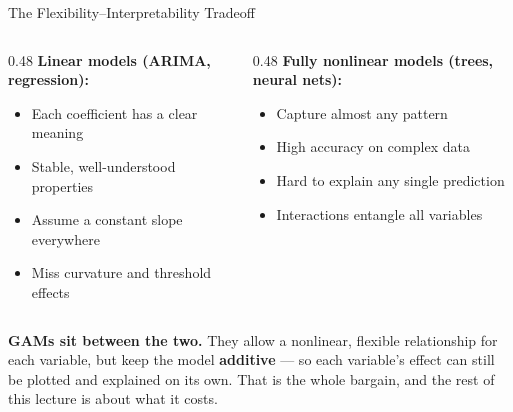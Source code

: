 \documentclass[aspectratio=169, 11pt]{beamer}
\begin{document}
\begin{frame}{The Flexibility--Interpretability Tradeoff}
  \begin{columns}[T]
    \begin{column}{0.48\textwidth}
      \textbf{Linear models (ARIMA, regression):}
      {
      \begin{itemize}\small\itemsep0pt
        \item Each coefficient has a clear meaning
        \item Stable, well-understood properties
      \end{itemize}}
      {
      \begin{itemize}\small\itemsep0pt
        \item Assume a constant slope everywhere
        \item Miss curvature and threshold effects
      \end{itemize}}
    \end{column}
    \begin{column}{0.48\textwidth}
      \textbf{Fully nonlinear models (trees, neural nets):}
      {
      \begin{itemize}\small\itemsep0pt
        \item Capture almost any pattern
        \item High accuracy on complex data
      \end{itemize}}
      {
      \begin{itemize}\small\itemsep0pt
        \item Hard to explain any single prediction
        \item Interactions entangle all variables
      \end{itemize}}
    \end{column}
  \end{columns}

  \vspace{0.3cm}
  \textbf{GAMs sit between the two.} They allow a nonlinear, flexible relationship for each
  variable, but keep the model \textbf{additive} --- so each variable's effect can still be
  plotted and explained on its own. That is the whole bargain, and the rest of this lecture
  is about what it costs.
\end{frame}
\end{document}
